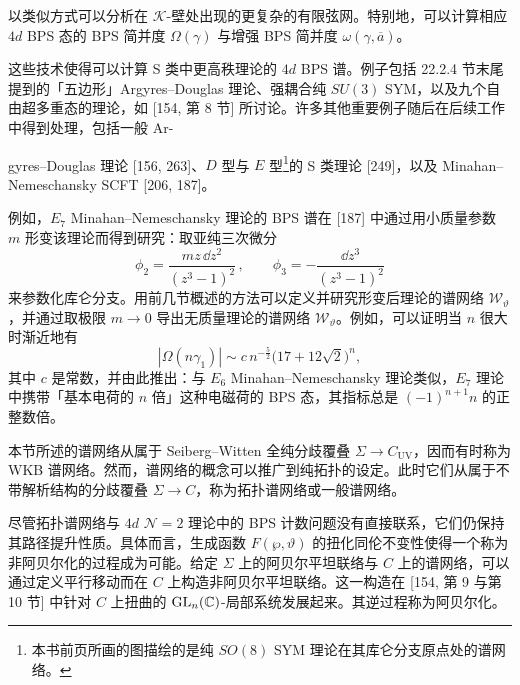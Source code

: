 以类似方式可以分析在 $\mathcal{K}$-壁处出现的更复杂的有限弦网。特别地，可以计算相应 $4d$ BPS 态的 BPS 简并度 $\Omega(\gamma)$ 与增强 BPS 简并度 $\omega(\gamma,\overline{a})$。

这些技术使得可以计算 S 类中更高秩理论的 $4d$ BPS 谱。例子包括 22.2.4 节末尾提到的「五边形」Argyres–Douglas 理论、强耦合纯 $SU(3)$ SYM，以及九个自由超多重态的理论，如 [154, 第 8 节] 所讨论。许多其他重要例子随后在后续工作中得到处理，包括一般 Ar-

gyres–Douglas 理论 [156, 263]、$D$ 型与 $E$ 型\footnote{本书前页所画的图描绘的是纯 $SO(8)$ SYM 理论在其库仑分支原点处的谱网络。}的 S 类理论 [249]，以及 Minahan–Nemeschansky SCFT [206, 187]。

例如，$E_7$ Minahan–Nemeschansky 理论的 BPS 谱在 [187] 中通过用小质量参数 $m$ 形变该理论而得到研究：取亚纯三次微分
\[
\phi_2=\frac{mz\,\dd z^2}{(z^3-1)^2}\,,\qquad \phi_3=-\frac{\dd z^3}{(z^3-1)^2}
\]
来参数化库仑分支。用前几节概述的方法可以定义并研究形变后理论的谱网络 $\mathcal{W}_\vartheta$，并通过取极限 $m\to0$ 导出无质量理论的谱网络 $\mathcal{W}_\vartheta$。例如，可以证明当 $n$ 很大时渐近地有
\[
|\Omega(n\gamma_1)|\sim c\,n^{-\frac{5}{2}}\big(17+12\sqrt{2}\big)^n,
\]
其中 $c$ 是常数，并由此推出：与 $E_6$ Minahan–Nemeschansky 理论类似，$E_7$ 理论中携带「基本电荷的 $n$ 倍」这种电磁荷的 BPS 态，其指标总是 $(-1)^{n+1}n$ 的正整数倍。


\begin{remark}[22.33]
本节所述的谱网络从属于 Seiberg–Witten 全纯分歧覆叠 $\Sigma\to C_{\mathrm{UV}}$，因而有时称为 WKB 谱网络。然而，谱网络的概念可以推广到纯拓扑的设定。此时它们从属于不带解析结构的分歧覆叠 $\Sigma\to C$，称为拓扑谱网络或一般谱网络。
\end{remark}

尽管拓扑谱网络与 $4d$ $\mathcal{N}=2$ 理论中的 BPS 计数问题没有直接联系，它们仍保持其路径提升性质。具体而言，生成函数 $F(\wp,\vartheta)$ 的扭化同伦不变性使得一个称为非阿贝尔化的过程成为可能。给定 $\Sigma$ 上的阿贝尔平坦联络与 $C$ 上的谱网络，可以通过定义平行移动而在 $C$ 上构造非阿贝尔平坦联络。这一构造在 [154, 第 9 与第 10 节] 中针对 $C$ 上扭曲的 $\operatorname{GL}_n(\mathbb{C})$-局部系统发展起来。其逆过程称为阿贝尔化。

